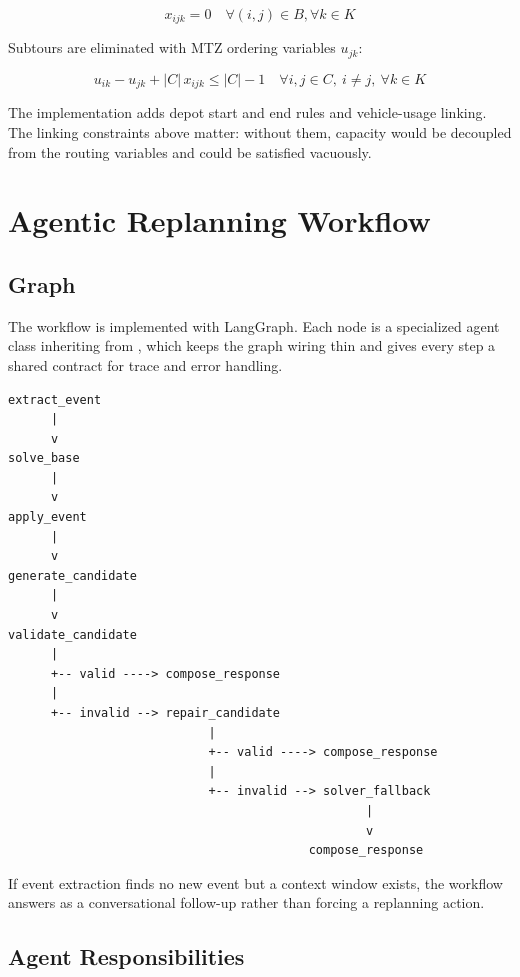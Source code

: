 \documentclass[11pt,a4paper]{article}
\begin{document}
\[
x_{ijk} = 0
\quad \forall (i,j) \in B, \forall k \in K
\]

Subtours are eliminated with MTZ ordering variables $u_{jk}$:

\[
u_{ik} - u_{jk} + |C|\, x_{ijk} \leq |C| - 1
\quad \forall i,j \in C,\ i \neq j,\ \forall k \in K
\]

The implementation adds depot start and end rules and vehicle-usage linking. The linking constraints
above matter: without them, capacity would be decoupled from the routing variables and could be
satisfied vacuously.

\section{Agentic Replanning Workflow}

\subsection{Graph}

The workflow is implemented with LangGraph. Each node is a specialized agent class inheriting from
, which keeps the graph wiring thin and gives every step a shared contract
for trace and error handling.

\begin{verbatim}
extract_event
      |
      v
solve_base
      |
      v
apply_event
      |
      v
generate_candidate
      |
      v
validate_candidate
      |
      +-- valid ----> compose_response
      |
      +-- invalid --> repair_candidate
                            |
                            +-- valid ----> compose_response
                            |
                            +-- invalid --> solver_fallback
                                                  |
                                                  v
                                          compose_response
\end{verbatim}

If event extraction finds no new event but a context window exists, the workflow answers as a
conversational follow-up rather than forcing a replanning action.

\subsection{Agent Responsibilities}
\end{document}
